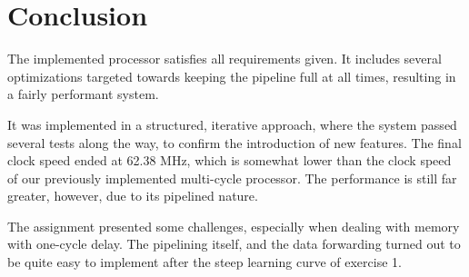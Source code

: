 \chapter{Conclusion}

The implemented processor satisfies all requirements given.
It includes several optimizations targeted towards keeping the pipeline full at all times,
resulting in a fairly performant system.

It was implemented in a structured, iterative approach, where the system passed several tests along the way, to confirm the introduction of new features.
The final clock speed ended at 62.38 MHz, which is somewhat lower than the clock speed of our previously implemented multi-cycle processor.
The performance is still far greater, however, due to its pipelined nature.

The assignment presented some challenges, especially when dealing with memory with one-cycle delay.
The pipelining itself, and the data forwarding turned out to be quite easy to implement after the steep learning curve of exercise 1.
